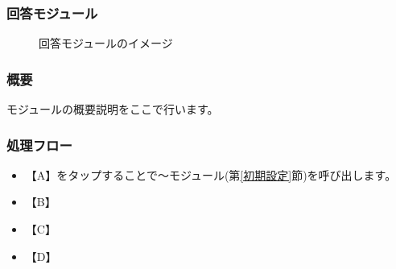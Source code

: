 \documentclass[a4j]{jarticle}
\begin{document}
\subsubsection{回答モジュール\label{回答}} %
\begin{figure}[H]
    \begin{center}
    \caption {回答モジュールのイメージ}
    \label{functionselection}
    \end{center}
\end{figure}
\subsubsection*{概要}
モジュールの概要説明をここで行います。
\subsubsection*{処理フロー}
\begin{itemize}
\item 【A】をタップすることで～モジュール(第\ref{初期設定}節)を呼び出します。%
\item 【B】
\item 【C】
\item 【D】
\end{itemize}
\end{document}
